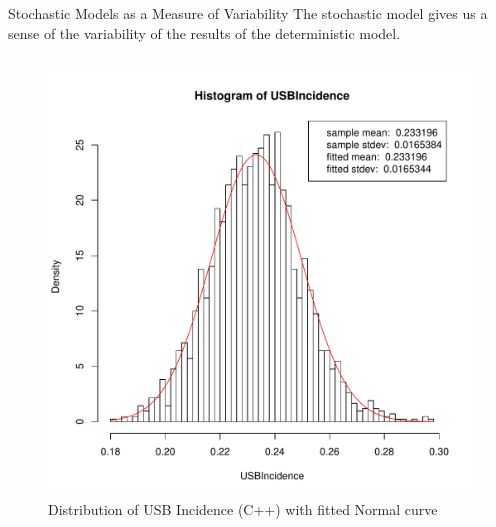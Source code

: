 \documentclass[final]{beamer}
\begin{document}
\begin{frame}
\begin{columns}
\begin{column}{.3\textwidth}
      \begin{block}{Stochastic Models as a Measure of Variability}
        The stochastic model gives us a sense of the variability of the results
        of the deterministic model.
        \begin{block}{}
          \begin{column}{.45\textwidth}
            \begin{figure}[h]
              \begin{center}
                \includegraphics[width=\textwidth]{IN0dist}
              \end{center}
              \caption{Distribution of USB Incidence (C++) with fitted Normal curve}
              \label{fig:IN0dist}
            \end{figure}
          \end{column}
          \begin{column}{.45\textwidth}
            \begin{figure}[h]
              \begin{center}

\end{center}
\end{figure}
\end{column}
\end{block}
\end{block}
\end{column}
\end{columns}
\end{frame}
\end{document}
